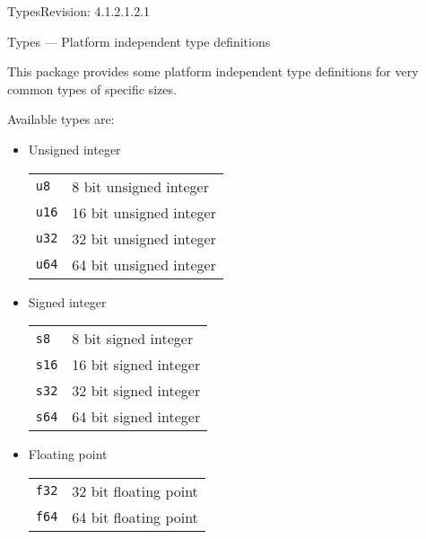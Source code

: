 \begin{manpage}{\libtitle}{Types}{$ $Revision: 4.1.2.1.2.1 $ $}

\subtitle{Name}
    Types --- Platform independent type definitions


\subtitle{Description}
    This package provides some platform independent type definitions for very
    common types of specific sizes.


\subtitle{Declaration}


\subtitle{Generic Types}
    Available types are:
    \begin{itemize}
    \item Unsigned integer

    \begin{tabular}{|l|l|}
    \hline
    \texttt{u8}  & 8 bit unsigned integer \\
    \texttt{u16} & 16 bit unsigned integer \\
    \texttt{u32} & 32 bit unsigned integer \\
    \texttt{u64} & 64 bit unsigned integer \\
    \hline
    \end{tabular}

    \item Signed integer

    \begin{tabular}{|l|l|}
    \hline
    \texttt{s8}  & 8 bit signed integer \\
    \texttt{s16} & 16 bit signed integer \\
    \texttt{s32} & 32 bit signed integer \\
    \texttt{s64} & 64 bit signed integer \\
    \hline
    \end{tabular}

    \item {} Floating point

    \begin{tabular}{|l|l|}
    \hline
    \texttt{f32} & 32 bit floating point \\
    \texttt{f64} & 64 bit floating point \\
    \hline
    \end{tabular}
    \end{itemize}


\end{manpage}
